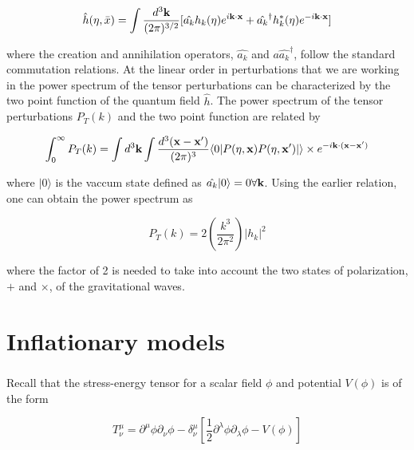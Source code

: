 \documentclass[12pt,a4paper,oneside]{book}
\begin{document}
\begin{equation}
\hat{h}(\eta, \bar{x}) = \int \frac{d^3\bf{k}}{(2\pi)^{3/2}} [\hat{a_k}h_k(\eta)e^{i\bf{k\cdot x}}+ \hat{a_k}^{\dagger}h_k^{*}(\eta)e^{-i\bf{k\cdot x}}] 
\end{equation}

\noindent where the creation and annihilation operators, $\hat{a_k}$ and $a\hat{a_k}^{\dagger}$, follow the standard commutation relations. At the linear order in perturbations that we are working in the power spectrum of the tensor perturbations can be characterized by the two point function of the quantum field $\hat{h}$. The power spectrum of the tensor perturbations $P_T(k)$ and the two point function are related by

\begin{equation}
\int^{\infty}_0 P_T(k) = \int d^3{\bf{k}}\int\frac{d^3(\bf{x}-\bf{x'})}{(2\pi)^3}\langle 0|P(\eta,{\bf{x}})P(\eta, {\bf{x'}})|\rangle \times e^{-i{\bf{k \cdot (x-x')}}}
\end{equation}

\noindent where $|0\rangle$ is the vaccum state defined as $\hat{a_k}|0\rangle = 0 \forall {\bf{k}}$. Using the earlier relation, one can obtain the power spectrum as

\begin{equation}
P_T(k) = 2 (\frac{k^3}{2\pi^2}) |h_k|^2
\end{equation}

\noindent where the factor of 2 is needed to take into account the two states of polarization, $+$ and $\times$, of the gravitational waves.


\chapter{Inflationary models}


\paragraph*{} Recall that the stress-energy tensor for a scalar field $\phi$ and potential $V(\phi)$ is of the form

\begin{equation}
T^{\mu}_{\nu} = \partial^{\mu}\phi \partial_{\nu}\phi -\delta^{\mu}_{\nu}[\frac{1}{2}\partial^{\lambda}\phi \partial_{\lambda}\phi - V(\phi)]
\end{equation}
\end{document}
